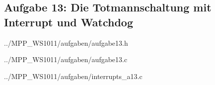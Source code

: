 \subsection*{Aufgabe 13: Die Totmannschaltung mit Interrupt und Watchdog}


{../MPP_WS1011/aufgaben/aufgabe13.h}


{../MPP_WS1011/aufgaben/aufgabe13.c}


{../MPP_WS1011/aufgaben/interrupts_a13.c}
